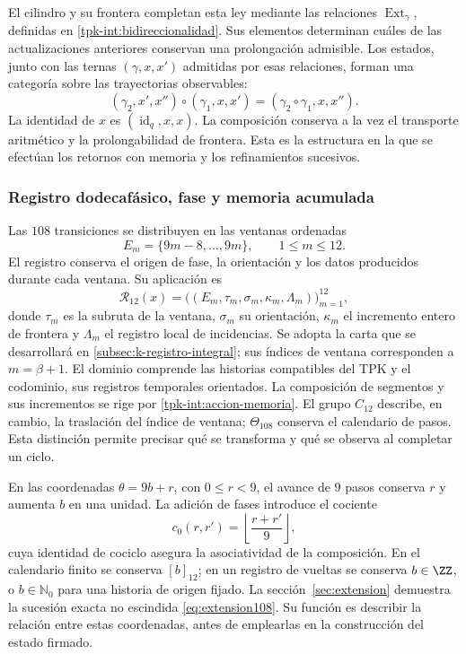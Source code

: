 El cilindro y su frontera completan esta ley mediante las relaciones
\(\operatorname{Ext}_\gamma\), definidas en
\ref{tpk-int:bidireccionalidad}. Sus elementos determinan cuáles de
las actualizaciones anteriores conservan una prolongación admisible.
Los estados, junto con las ternas \((\gamma,x,x')\) admitidas por
esas relaciones, forman una categoría sobre las trayectorias observables:
\[
 (\gamma_2,x',x'')\circ(\gamma_1,x,x')
     =(\gamma_2\circ\gamma_1,x,x'').
\]
La identidad de \(x\) es \((\operatorname{id}_q,x,x)\).
La composición conserva a la vez el transporte aritmético y la
prolongabilidad de frontera. Esta es la estructura en la que se efectúan
los retornos con memoria y los refinamientos sucesivos.

\subsubsection{Registro dodecafásico, fase y memoria acumulada}
\label{tpk-int:dodecafase}

Las \(108\) transiciones se distribuyen en las ventanas ordenadas
\[
 E_m=\{9m-8,\ldots,9m\},\qquad 1\leq m\leq12.
\]
El registro conserva el origen de fase, la orientación y los datos
producidos durante cada ventana. Su aplicación es
\[
 \mathcal R_{12}(x)=
 \bigl((E_m,\tau_m,\sigma_m,\kappa_m,\Lambda_m)\bigr)_{m=1}^{12},
\]
donde \(\tau_m\) es la subruta de la ventana, \(\sigma_m\) su
orientación, \(\kappa_m\) el incremento entero de frontera y
\(\Lambda_m\) el registro local de incidencias. Se adopta la carta
que se desarrollará en \ref{subsec:k-registro-integral}; sus índices
de ventana corresponden a \(m=\beta+1\).
El dominio comprende las historias compatibles
del TPK y el codominio, sus registros temporales orientados. La
composición de segmentos y sus incrementos se rige por
\eqref{tpk-int:accion-memoria}. El grupo \(C_{12}\) describe, en
cambio, la traslación del índice de ventana; \(\Theta_{108}\) conserva
el calendario de pasos. Esta distinción permite precisar qué se transforma
y qué se observa al completar un ciclo.

En las coordenadas \(\theta=9b+r\), con \(0\leq r<9\), el avance
de \(9\) pasos conserva \(r\) y aumenta \(b\) en una unidad.
La adición de fases introduce el cociente
\[
 c_0(r,r')=\left\lfloor\frac{r+r'}9\right\rfloor,
\]
cuya identidad de cociclo asegura la asociatividad de la composición.
En el calendario finito se conserva \([b]_{12}\); en un registro de
vueltas se conserva \(b\in\ZZ\), o \(b\in\mathbb N_0\) para
una historia de origen fijado. La sección~\ref{sec:extension} demuestra
la sucesión exacta no escindida \eqref{eq:extension108}. Su función es
describir la relación entre estas coordenadas, antes de emplearlas en la
construcción del estado firmado.

